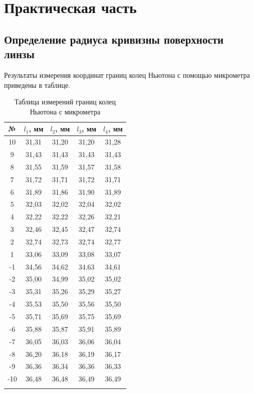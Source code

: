 \section{Практическая часть}

\subsection{Определение радиуса кривизны поверхности линзы}

Результаты измерения координат границ колец Ньютона с помощью микрометра приведены в таблице.

\begin{table}[H]
	\centering
	\caption{Таблица измерений границ колец Ньютона с микрометра}
	\begin{tabular}{ccccc}
		\toprule
		№ & $l_1$, мм &   $l_2$, мм &  $l_3$, мм &  $l_4$, мм \\
		\midrule
		10 & 31,31 & 	  31,20 &  31,20 &  31,28 \\
		9 & 31,43&   31,43 &  31,43 &  31,43 \\
		8 & 31,55&   31,59 &  31,57 &  31,58 \\
		7 & 31,72&   31,71 &  31,72 &  31,71 \\
		6 & 31,89&   31,86 &  31,90 &  31,89 \\
		5 & 32,03&   32,02 &  32,04 &  32,02 \\
		4 & 32,22&   32,22 &  32,26 &  32,21 \\
		3 & 32,46&   32,45 &  32,47 &  32,74 \\
		2 & 32,74&   32,73 &  32,74 &  32,77 \\
		1 & 33,06&   33,09 &  33,08 &  33,07 \\
		-1 & 34,56&   34,62 &  34,63 &  34,61 \\
		-2 & 35,00&   34,99 &  35,02 &  35,02 \\
		-3 & 35,31&   35,26 &  35,29 &  35,27 \\
		-4 & 35,53&   35,50 &  35,56 &  35,50 \\
		-5 & 35,71&   35,69 &  35,75 &  35,69 \\
		-6 & 35,88&   35,87 &  35,91 &  35,89 \\
		-7 & 36,05&   36,03 &  36,06 &  36,04 \\
		-8 & 36,20&   36,18 &  36,19 &  36,17 \\
		-9 & 36,36&   36,34 &  36,36 &  36,33 \\
		-10 & 36,48&   36,48 &  36,49 &  36,49 \\
		\bottomrule& 
	\end{tabular}
\end{table}



